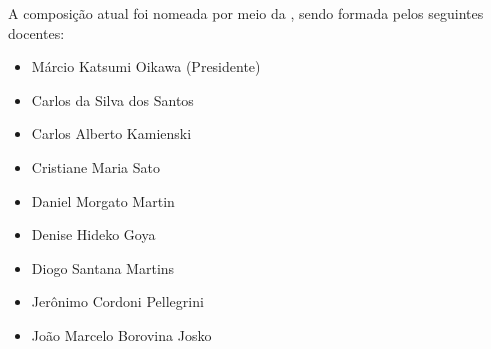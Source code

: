 A composição atual foi nomeada por meio da , sendo
formada pelos seguintes docentes:
\begin{itemize}
    \item Márcio Katsumi Oikawa (Presidente)
    \item Carlos da Silva dos Santos
    \item Carlos Alberto Kamienski
    \item Cristiane Maria Sato
    \item Daniel Morgato Martin
    \item Denise Hideko Goya
    \item Diogo Santana Martins
    \item Jerônimo Cordoni Pellegrini
    \item João Marcelo Borovina Josko
\end{itemize}
